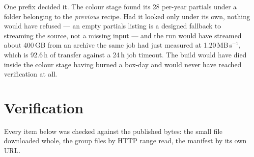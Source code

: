 \documentclass[10pt]{article}
\begin{document}
One prefix decided it. The colour stage found its 28 per-year partials under a
folder belonging to the \emph{previous} recipe. Had it looked only under its
own, nothing would have refused --- an empty partials listing is a designed
fallback to streaming the source, not a missing input --- and the run would
have streamed about 400\,GB from an archive the same job had just measured at
1.20\,MB\,s$^{-1}$, which is 92.6\,h of transfer against a 24\,h job timeout.
The build would have died inside the colour stage having burned a box-day and
would never have reached verification at all.

\section{Verification}

Every item below was checked against the published bytes: the small file
downloaded whole, the group files by HTTP range read, the manifest by its own
URL.
\end{document}
